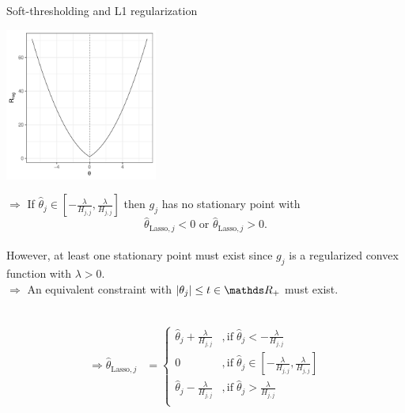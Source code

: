 \documentclass[11pt,compress,t,notes=noshow, xcolor=table]{beamer}
\begin{document}
\begin{vbframe}{Soft-thresholding and L1 regularization}
\begin{minipage}{0.4\textwidth}
    \includegraphics[width=5cm]{slides/regularization/figure/th_l1_zero.pdf}
\end{minipage}
\hfill
\begin{minipage}{0.49\textwidth}
$\Rightarrow$ If $\hat{\theta}_j \in [-\frac{\lambda}{H_{j,j}}, \frac{\lambda}{H_{j,j}}]$ then $g_j$ has no stationary point with $$\hat{\theta}_{\text{Lasso},j} < 0 \text{ or } \hat{\theta}_{\text{Lasso},j} > 0.$$ \\
However, at least one stationary point must exist since $g_j$ is a regularized convex function with $\lambda > 0.$\\
$\Rightarrow$ An equivalent constraint with $\vert\theta_j\vert \leq t \in\R_+$ must exist.
\end{minipage}
 \\

\begin{align*}\Rightarrow \hat{\theta}_{\text{Lasso},j} &= \begin{cases} 
     \hat{\theta}_j + \frac{\lambda}{H_{j,j}} &, \text{if}   \;\hat{\theta}_j < -\frac{\lambda}{H_{j,j}} \\
       0 &, \text{if}   \;\hat{\theta}_j \in [-\frac{\lambda}{H_{j,j}}, \frac{\lambda}{H_{j,j}}] \\
     \hat{\theta}_j - \frac{\lambda}{H_{j,j}} &, \text{if}   \;\hat{\theta}_j > \frac{\lambda}{H_{j,j}} \\
     \end{cases}
     \end{align*}

\end{vbframe}

\endlecture
\end{document}
